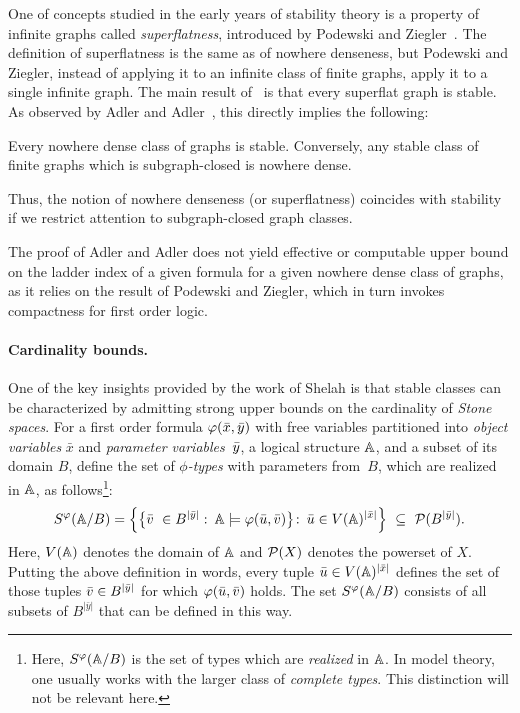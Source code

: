   One of concepts studied in the early 
  years of stability theory is 
  a property of infinite graphs  called \emph{superflatness}, introduced by Podewski and Ziegler~\cite{podewski1978stable}.
  The definition of superflatness is the same as   of nowhere denseness, but 
   Podewski and Ziegler,
  instead of applying it to an infinite class of finite graphs, apply it to a single infinite graph.
  The main result of~\cite{podewski1978stable} is that every superflat graph is stable.   
As observed by Adler and Adler~\cite{adler2014interpreting}, 
this directly implies  the following:
 \begin{theorem}\label{thm:adleradler}
 	Every nowhere dense class of graphs is stable. Conversely, any stable class of finite graphs which is subgraph-closed  is nowhere dense.
 \end{theorem}
 Thus, the notion of nowhere denseness (or superflatness) coincides with stability if we restrict attention to subgraph-closed graph classes.
 
The proof of Adler and Adler does not yield effective or computable upper bound on the 
ladder index of a given formula for a given nowhere dense class of graphs, as it relies on the result of Podewski and Ziegler, which in turn invokes compactness for first order logic.

\paragraph{Cardinality bounds.}
One of the key insights provided by the work of Shelah is that stable classes can be characterized by admitting strong upper bounds on the cardinality of \emph{Stone spaces}.
For a first order formula $\varphi(\bar{x},\bar{y})$ 
with free variables partitioned into \emph{object variables} $\bar x$ and \emph{parameter variables}~$\bar{y}$, a logical structure $\mathbb A$,
and a subset of its domain $B$, define
the set of \emph{$\phi$-types} with parameters from~$B$, which are realized in 
$\mathbb{A}$, as follows\footnote{Here, $S^\varphi(\mathbb A/B)$ is the set  of types which are \emph{realized} in $\mathbb A$. In model theory,
one usually works with the larger class of \emph{complete types}. This distinction will not be relevant here.}:
\begin{equation}\label{eq:stone-def}
S^\varphi (\mathbb{A}/B)  = 
  \left\{\big\{\bar{v}\ \in B^{|\bar y|}\, \colon\, \mathbb{A}\models\varphi(\bar{u},\bar{v})\big\} \colon\, \bar{u}\in V(\mathbb{A})^{|\bar x|}\right\}\  \subseteq\  \mathcal{P}(B^{|\bar y|}).
\end{equation}
Here, $V(\mathbb{A})$ denotes the domain of $\mathbb{A}$ and $\mathcal{P}(X)$ denotes the powerset of $X$.
Putting the above definition in words, every tuple $\bar{u}\in V(\mathbb{A})^{|\bar x|}$ defines the set of those tuples $\bar{v}\in B^{|\bar y|}$ for which $\varphi(\bar{u},\bar{v})$ holds.
The set $S^\varphi(\mathbb{A}/B)$ consists of all subsets of $B^{|\bar y|}$ that can be defined in this way.

